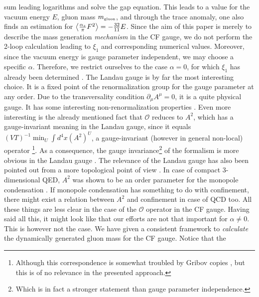 \documentclass[a4paper,12pt]{article}
\newcommand{\text}{\textrm}
\begin{document}
sum leading logarithms and solve the gap equation. This leads to a value for
the vacuum energy $E$, gluon mass $m_{\text{{\tiny {gluon}}}}$, and through
the trace anomaly, one also finds an estimation for $\left\langle \frac{%
\alpha _{s}}{\pi }F^{2}\right\rangle =-\frac{32}{11}E$. Since the
aim of this paper is merely to describe the mass generation
\emph{mechanism} in the CF gauge, we do not perform the 2-loop
calculation leading to $\xi _{1}$ and corresponding numerical
values. Moreover, since the vacuum energy is gauge parameter
independent, we may choose a specific $\alpha $. Therefore, we
restrict ourselves to the case $\alpha =0$, for which $\xi _{1}$
has already been determined \cite{v1}.\newline
\newline
The Landau gauge is by far the most interesting choice. It is a
fixed point of the renormalization group for the gauge parameter
at any order. Due to the transversality condition $\partial _{\mu
}A^{\mu }=0$, it is a quite physical gauge. It has some
interesting non-renormalization properties \cite {book}. Even more
interesting is the already mentioned fact that $\mathcal{O} $
reduces to $A^{2}$, which has a gauge-invariant meaning in the
Landau gauge, since it equals $(VT)^{-1}\min_{U}\int d^{4}x\left(
A^{2}\right) ^{U}$, a gauge-invariant (however in general non-local) operator%
\footnote{%
Although this correspondence is somewhat troubled by Gribov copies \cite
{Stodolsky:2002st}, but this is of no relevance in the presented approach.}.
As a consequence, the gauge invariance\footnote{%
Which is in fact a stronger statement than gauge parameter
independence.} of the formalism is more obvious in the Landau
gauge \cite{v1}. The relevance of the Landau gauge has also been
pointed out from a more topological point of view
\cite{Gubarev:2000nz}. In case of compact 3-dimensional QED,
$A^{2}$ was shown to be an order parameter for the monopole
condensation \cite {Gubarev:2000eu,Gubarev:2000nz}. If monopole
condensation has something to do with confinement, there might
exist a relation between $A^{2}$ and confinement in case of QCD
too. All these things are less clear in the case of the
$\mathcal{O}$ operator in the CF gauge.\newline
\newline
Having said all this, it might look like that our efforts are not
that important for $\alpha \neq 0$. This is however not the case.
We have given a consistent framework to \emph{calculate} the
dynamically generated gluon mass for the CF gauge. Notice that the
\end{document}
